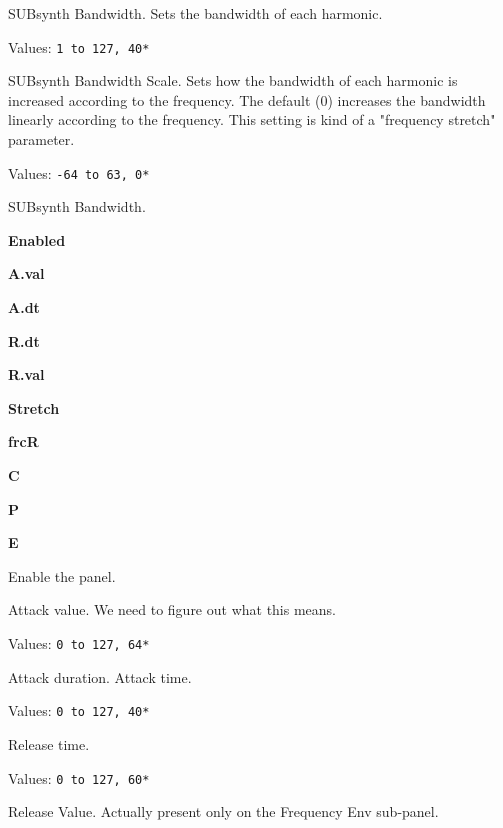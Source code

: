    \setcounter{ItemCounter}{0}      %

   SUBsynth Bandwidth.
   Sets the bandwidth of each harmonic.

   Values: \texttt{1 to 127, 40*}

   SUBsynth Bandwidth Scale.
   Sets how the bandwidth of each harmonic is increased according to the
   frequency. The default (0) increases the bandwidth linearly according to
   the frequency.
   This setting is kind of a "frequency stretch" parameter.

   Values: \texttt{-64 to 63, 0*}

   SUBsynth Bandwidth.

   \begin{enumber}
      \item \textbf{Enabled}
      \item \textbf{A.val}
      \item \textbf{A.dt}
      \item \textbf{R.dt}
      \item \textbf{R.val}
      \item \textbf{Stretch}
      \item \textbf{frcR}
      \item \textbf{C}
      \item \textbf{P}
      \item \textbf{E}
   \end{enumber}

   \setcounter{ItemCounter}{0}      %

   Enable the panel.

   Attack value.
   We need to figure out what this means.

   Values: \texttt{0 to 127, 64*}

   Attack duration. Attack time.

   Values: \texttt{0 to 127, 40*}

   Release time.

   Values: \texttt{0 to 127, 60*}

   Release Value.
   Actually present only on the Frequency Env sub-panel.

